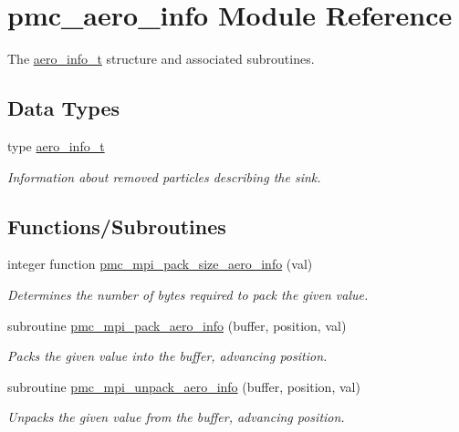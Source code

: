 \hypertarget{namespacepmc__aero__info}{}\section{pmc\+\_\+aero\+\_\+info Module Reference}
\label{namespacepmc__aero__info}


The \mbox{\hyperlink{structpmc__aero__info_1_1aero__info__t}{aero\+\_\+info\+\_\+t}} structure and associated subroutines.  


\subsection*{Data Types}
\begin{DoxyCompactItemize}
\item 
type \mbox{\hyperlink{structpmc__aero__info_1_1aero__info__t}{aero\+\_\+info\+\_\+t}}
\begin{DoxyCompactList}\small\item\em Information about removed particles describing the sink. \end{DoxyCompactList}\end{DoxyCompactItemize}
\subsection*{Functions/\+Subroutines}
\begin{DoxyCompactItemize}
\item 
integer function \mbox{\hyperlink{namespacepmc__aero__info_a15989c385217c4181bc788242365712d}{pmc\+\_\+mpi\+\_\+pack\+\_\+size\+\_\+aero\+\_\+info}} (val)
\begin{DoxyCompactList}\small\item\em Determines the number of bytes required to pack the given value. \end{DoxyCompactList}\item 
subroutine \mbox{\hyperlink{namespacepmc__aero__info_a2e8144e95d3c134b5e08eca2d17aca32}{pmc\+\_\+mpi\+\_\+pack\+\_\+aero\+\_\+info}} (buffer, position, val)
\begin{DoxyCompactList}\small\item\em Packs the given value into the buffer, advancing position. \end{DoxyCompactList}\item 
subroutine \mbox{\hyperlink{namespacepmc__aero__info_a00bba9f51f794c076d7cb4eeb7f25eac}{pmc\+\_\+mpi\+\_\+unpack\+\_\+aero\+\_\+info}} (buffer, position, val)
\begin{DoxyCompactList}\small\item\em Unpacks the given value from the buffer, advancing position. \end{DoxyCompactList}\end{DoxyCompactItemize}
